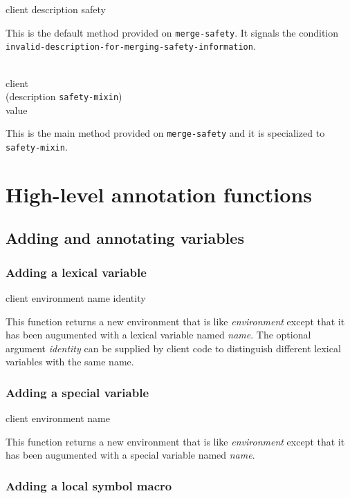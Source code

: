 {\footnotesize
{} {client description safety}
}

This is the default method provided on \texttt{merge-safety}.  It
signals the condition
\texttt{invalid-description-for-merging-safety-information}.

{\footnotesize
{}\\
           {client\\
            (description {\tt safety-mixin})\\
            value}
}

This is the main method provided on \texttt{merge-safety} and it is
specialized to \texttt{safety-mixin}.

\section{High-level annotation functions}
\label{sec-high-level-annotation-functions}

\subsection{Adding and annotating variables}

\subsubsection{Adding a lexical variable}

{\footnotesize
{} {client environment name \optional identity}
}

This function returns a new environment that is like
\textit{environment} except that it has been augumented with a lexical
variable named \textit{name}.  The optional argument \textit{identity}
can be supplied by client code to distinguish different lexical
variables with the same name.

\subsubsection{Adding a special variable}

{\footnotesize
{} {client environment name}
}

This function returns a new environment that is like
\textit{environment} except that it has been augumented with a special
variable named \textit{name}.

\subsubsection{Adding a local symbol macro}

